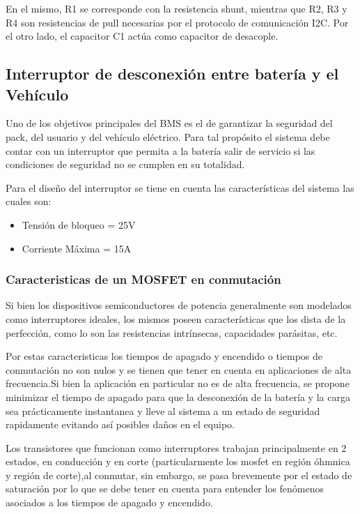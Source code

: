 \documentclass[10pt,a4paper]{article}
\begin{document}
En el mismo, R1 se corresponde con la resistencia shunt, mientras que R2, R3 y
R4 son resistencias de pull necesarias por el protocolo de comunicaci\'on I2C.
Por el otro lado, el capacitor C1 act\'ua como capacitor de desacople.

\subsection{Interruptor de desconexión entre batería y el Vehículo}

Uno de los objetivos principales del BMS es el de garantizar la seguridad del
pack, del usuario y del vehículo eléctrico. Para tal propósito el sistema debe
contar con un interruptor que permita a la batería salir de servicio si las
condiciones de seguridad no se cumplen en su totalidad.

Para el diseño del interruptor se tiene en cuenta las características del
sistema las cuales son:

\begin{itemize}
	\item Tensión de bloqueo = 25V
	\item Corriente Máxima = 15A
\end{itemize}

\subsubsection{Caracteristicas de un MOSFET en conmutación}

Si bien los dispositivos semiconductores de potencia generalmente son modelados
como interruptores ideales, los mismos poseen características que los dista de
la perfección, como lo son las resistencias intrínsecas, capacidades parásitas,
etc.

Por estas caracteristicas los tiempos de apagado y encendido o tiempos de
conmutación no son nulos y se tienen que tener en cuenta en aplicaciones de alta
frecuencia.Si bien la aplicación en particular no es de alta frecuencia, se
propone minimizar el tiempo de apagado para que la desconexión de la batería y
la carga sea prácticamente instantanea y lleve al sistema a un estado de
seguridad rapidamente evitando así posibles daños en el equipo.

Los transistores que funcionan como interruptores trabajan principalmente en 2
estados, en conducción y en corte (particularmente los mosfet en región
\'ohmnica y región de corte),al conmutar, sin embargo, se pasa brevemente por el 
estado de saturación por lo que se debe tener en cuenta para entender los 
fenómenos asociados a los tiempos de apagado y encendido.
\end{document}
